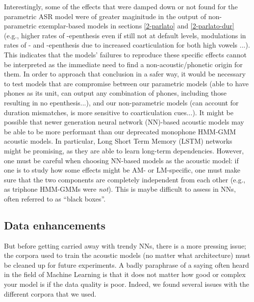 {Interestingly, some of the effects that were damped down or not found for the parametric ASR model were of greater maginitude in the output of non-parametric exemplar-based models in sections \ref{2-parlato} and \ref{2-parlato-dur} (e.g., higher rates of -epenthesis even if still not at default levels, modulations in rates of - and -epenthesis due to increased coarticulation for both high vowels ...). This indicates that the models' failures to reproduce these specific effects cannot be interpreted as the immediate need to find a non-acoustic/phonetic origin for them. In order to approach that conclusion in a safer way, it would be necessary to test models that are compromise between our parametric models (able to have phones as its unit, can output any combination of phones, including those resulting in no epenthesis...), and our non-parametric models (can account for duration mismatches, is more sensitive to coarticulation cues...). It might be possible that newer generation neural network (NN)-based acoustic models may be able to be more performant than our deprecated monophone HMM-GMM acoustic models. In particular, Long Short Term Memory (LSTM) networks might be promising, as they are able to learn long-term dependencies. However, one must be careful when choosing NN-based models as the acoustic model: if one is to study how some effects might be AM- or LM-specific, one must make sure that the two components are completely independent from each other (e.g., as triphone HMM-GMMs were \textit{not}). This is maybe difficult to assess in NNs, often referred to as ``black boxes''.

\subsection{Data enhancements}
But before getting carried away with trendy NNs, there is a more pressing issue; the corpora used to train the acoustic models (no matter what architecture) must be cleaned up for future experiments. A badly paraphrase of a saying often heard in the field of Machine Learning is that it does not matter how good or complex your model is if the data quality is poor. Indeed, we found several issues with the different corpora that we used.

}
